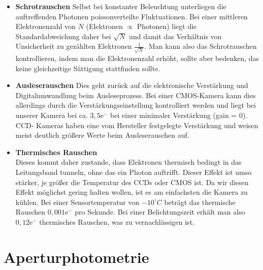 \documentclass[ngerman,ruledheaders=section,class=report,thesis={type=Protokoll},accentcolor=1b,marginpar=false,parskip=half-,fontsize=11pt,]{tudapub}
\begin{document}
	\begin{itemize}
		\item \textbf{Schrotrauschen}
		Selbst bei konstanter Beleuchtung unterliegen die auftreffenden Photonen poissonverteilte Fluktuationen. Bei einer mittleren Elektronenzahl von $N$ (Elektronen $\propto$ Photonen) liegt die Standardabweichung daher bei $\sqrt{N}$ und damit das Verhältnis von Unsicherheit zu gezählten Elektronen $\frac{1}{\sqrt{N}}$. Man kann also das Schrotrauschen kontrollieren, indem man die Elektronenzahl erhöht, sollte aber bedenken, das keine gleichzeitige Sättigung stattfinden sollte. 
		\item \textbf{Ausleserauschen}
		Dies geht zurück auf die elektronische Verstärkung und Digitalumwandlung beim Ausleseprozess. Bei einer CMOS-Kamera kann dies allerdings durch die Verstärkungseinstellung kontrolliert werden und liegt bei unserer Kamera bei ca. $3,5 \text{e}^-$ bei einer minimaler Verstärkung (gain = 0). CCD- Kameras haben eine vom Hersteller festgelegte Verstärkung und weisen meist deutlich größere Werte beim Ausleserauschen auf. 
		\item \textbf{Thermisches Rauschen} \\
		Dieses kommt daher zustande, dass Elektronen thermisch bedingt in das Leitungsband tunneln, ohne das ein Photon auftrifft. Dieser Effekt ist umso stärker, je größer die Temperatur des CCDs oder CMOS ist. Da wir diesen Effekt möglichst gering halten wollen, ist es am einfachsten die Kamera zu kühlen. Bei einer Sensortemperatur von $-10^ \circ\si{C}$ beträgt das thermische Rauschen $0,001 \text{e}^-$ pro Sekunde. Bei einer Belichtungszeit erhält man also $0,12 \text{e}^-$ thermisches Rauschen, was zu vernachlässigen ist. \\
		
	\end{itemize}
	
	\section{Aperturphotometrie}
\end{document}
